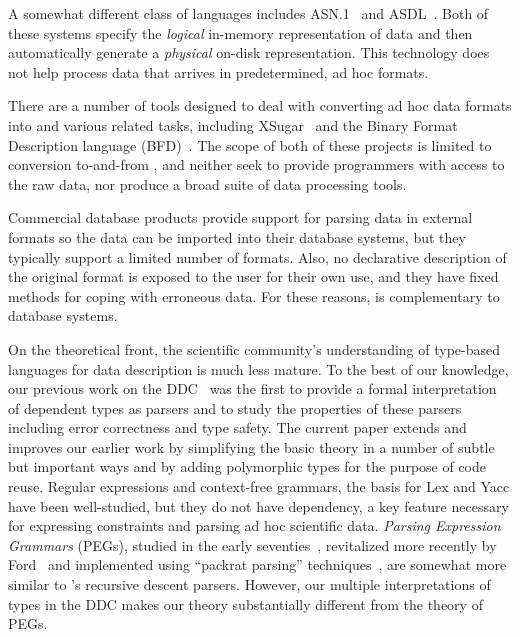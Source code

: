 A somewhat different class of languages includes
\textsc{ASN.1}~\cite{asn} and \textsc{ASDL}~\cite{asdl}.  Both of
these systems specify the {\em logical\/} in-memory representation of
data and then automatically generate a {\em physical\/} on-disk
representation.  This technology does not help process data that
arrives in predetermined, ad hoc formats.

There are a number of tools designed to deal with converting ad hoc
data formats into \xml{} and various related tasks, including
XSugar~\cite{brabrand+:xsugar2005} and the Binary Format Description
language (BFD)~\cite{bfd}. The scope of both of these projects is
limited to conversion to-and-from \xml{}, and neither seek to provide
programmers with access to the raw data, nor produce a broad suite of
data processing tools.


Commercial database products provide support for
parsing data in external formats so the data can be imported into
their database systems, but they typically support a limited number of
formats.  Also, no declarative description of the
original format is exposed to the user for their own use, and they
have fixed methods for coping with erroneous data.  For these reasons,
\padsml{} is complementary to database systems.  

On the theoretical front, the scientific community's understanding of
type-based languages for data description is much less mature.  To the
best of our knowledge, our previous work on the
DDC~\cite{fisher+:next700ddl} was the first to provide a formal
interpretation of dependent types as parsers and to study the
properties of these parsers including error correctness and type
safety.  The current paper extends and improves our earlier work by
simplifying the basic theory in a number of subtle but important ways
and by adding polymorphic types for the purpose of code reuse.
Regular expressions and context-free grammars, the basis for Lex and
Yacc have been well-studied, but they do not have dependency, a key
feature necessary for expressing constraints and parsing ad hoc
scientific data.  {\em Parsing Expression Grammars} (PEGs), studied in
the early seventies~\cite{birman+:parsing}, revitalized more recently
by Ford~\cite{ford:pegs} and implemented using ``packrat parsing''
techniques~\cite{ford:packrat,grimm:packrat}, are somewhat more
similar to \padsml{}'s recursive descent parsers. However, our
multiple interpretations of types in the DDC makes our theory
substantially different from the theory of PEGs.

